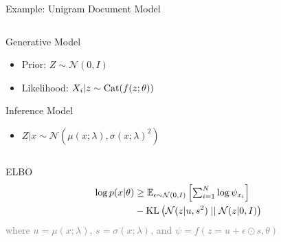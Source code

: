 \documentclass[14pt]{beamer}
\begin{document}
\begin{frame}{Example: Unigram Document Model}

\begin{columns}
	\begin{column}{0.75\textwidth}  

		Generative Model
		\begin{itemize}
			\item Prior: $Z \sim \mathcal N(0, I)$
			\item Likelihood: $X_i|z \sim \operatorname{Cat}(f(z; \theta))$
		\end{itemize}
   		Inference Model
		\begin{itemize}
			\item $Z|x \sim \mathcal N(\mu(x; \lambda), \sigma(x; \lambda)^2)$
		\end{itemize}
    \end{column}
	\begin{column}{0.2\textwidth}
    \end{column}    
    \end{columns}
    \pause
    
    \vspace{10pt}
    
    \alert{ELBO}
    \vspace{-10pt}
	\begin{equation*}
	\begin{aligned}		
		\log p(x|\theta) &\ge \mathbb E_{\epsilon \sim \mathcal N(0, I)}\left[ \textstyle\sum_{i=1}^N \log \psi_{x_i}\right] \\
		&- \operatorname{KL}\left(\mathcal N(z|u, s^2)\mid\mid \mathcal N(z|0, I)\right)
	\end{aligned}
	\end{equation*}
	\textcolor{gray}{{\small where $u = \mu(x; \lambda)$, $s = \sigma(x; \lambda)$, and $\psi = f(z = u + \epsilon \odot s, \theta)$ }}

\end{frame}
\end{document}
